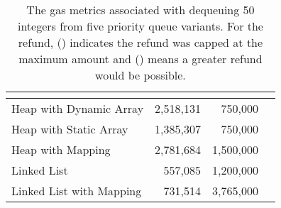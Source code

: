 

\begin{table}[t]
\centering
\begin{tabular}{|l|r|r|r|}

\multicolumn{1}{c}{} & \headrow{Gas Costs (\texttt{gasUsed})} & \headrow{Refund (Manual)} & \headrow{Full Refund?} \\ \hline

Heap with Dynamic Array       	& 2,518,131          & 750,000     &\full                  \\ \hline
Heap with Static Array          	& 1,385,307                             & 750,000      &\full                \\ \hline
Heap with Mapping 			& 2,781,684                            & 1,500,000    &\full                 \\ \hline
Linked List                     		& 557,085               	           & 1,200,000      &\full                \\ \hline
Linked List with Mapping      	& 731,514              	     	  &  3,765,000      &\full                 \\ \hline

\end{tabular}
\caption{\footnotesize{The gas metrics associated with dequeuing 50 integers from five priority queue variants. For the refund, (\full) indicates the  refund was capped at the maximum amount and (\prt) means a greater refund would be possible.}
\label{tab:PQUnitTests}}
\end{table}


